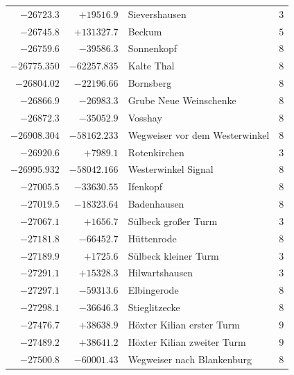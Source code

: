 \begin{center}
\begin{tabular}{r|r|p{170pt}|r}
\(-26723.3\)&\(+19516.9\)&Sievershausen&\(3\)\\
\(-26745.8\)&\(+131327.7\)&Beckum&\(5\)\\
\(-26759.6\)&\(-39586.3\)&Sonnenkopf&\(8\)\\
\(-26775.350\)&\(-62257.835\)&Kalte Thal&\(8\)\\
\(-26804.02\)&\(-22196.66\)&Bornsberg&\(8\)\\
\(-26866.9\)&\(-26983.3\)&Grube Neue Weinschenke&\(8\)\\
\(-26872.3\)&\(-35052.9\)&Vosshay&\(8\)\\
\(-26908.304\)&\(-58162.233\)&Wegweiser vor dem Westerwinkel&\(8\)\\
\(-26920.6\)&\(+7989.1\)&Rotenkirchen&\(3\)\\
\(-26995.932\)&\(-58042.166\)&Westerwinkel Signal&\(8\)\\
\(-27005.5\)&\(-33630.55\)&Ifenkopf&\(8\)\\
\(-27019.5\)&\(-18323.64\)&Badenhausen&\(8\)\\
\(-27067.1\)&\(+1656.7\)&Sülbeck großer Turm&\(3\)\\
\(-27181.8\)&\(-66452.7\)&Hüttenrode&\(8\)\\
\(-27189.9\)&\(+1725.6\)&Sülbeck kleiner Turm&\(3\)\\
\(-27291.1\)&\(+15328.3\)&Hilwartshausen&\(3\)\\
\(-27297.1\)&\(-59313.6\)&Elbingerode&\(8\)\\
\(-27298.1\)&\(-36646.3\)&Stieglitzecke&\(8\)\\
\(-27476.7\)&\(+38638.9\)&Höxter Kilian erster Turm&\(9\)\\
\(-27489.2\)&\(+38641.2\)&Höxter Kilian zweiter Turm&\(9\)\\
\(-27500.8\)&\(-60001.43\)&Wegweiser nach Blankenburg&\(8\)\\
\hline\end{tabular}\endgroup\end{center}
